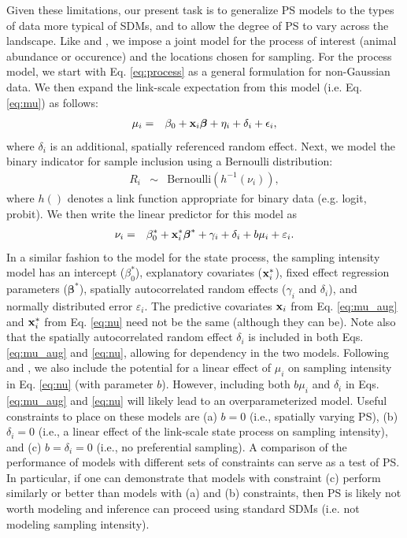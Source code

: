 \documentclass[times,mee,doublespace,]{besauth2}
\begin{document}
Given these limitations, our present task is to generalize PS models to the types of data more typical of SDMs, and to allow the degree of PS to vary across the landscape.  Like \citet{DiggleEtAl2010} and \citet{PatiEtAl2011}, we impose a joint model for the process of interest (animal abundance or occurence) and the locations chosen for sampling. For the process model, we start with Eq. \ref{eq:process} as a general formulation for non-Gaussian data.  We then expand the link-scale expectation from this model
(i.e. Eq. \ref{eq:mu}) as follows:
\begin{eqnarray}
  \mu_i & = & \beta_0 + {\bf x}_i \boldsymbol{\beta}+\eta_i+\delta_i+\epsilon_i,
\label{eq:mu_aug}
\end{eqnarray}
where $\delta_i$ is an additional, spatially referenced random effect.  Next, we model the binary indicator for sample inclusion using a Bernoulli distribution:
\begin{eqnarray}
  R_i & \sim & \text{Bernoulli}(h^{-1}(\nu_i)),
\end{eqnarray}
where $h()$ denotes a link function appropriate for binary data (e.g. logit, probit).  We then write the linear predictor for this model as
\begin{eqnarray}
  \nu_i & = & \beta_0^* + {\bf x}_i^* \boldsymbol{\beta}^*+\gamma_i+\delta_i+b \mu_i + \varepsilon_i.
\label{eq:nu}
\end{eqnarray}
 In a similar fashion to the model for the state process, the sampling intensity model has an intercept ($\beta_0^*$), explanatory covariates (${\bf x}_i^*$), fixed effect regression parameters ($\boldsymbol{\beta}^*$), spatially autocorrelated random effects ($\gamma_i$ and $\delta_i$), and normally distributed error $\varepsilon_i$.  The predictive covariates ${\bf x}_i$ from Eq. \ref{eq:mu_aug} and ${\bf x}_i^*$ from Eq. \ref{eq:nu} need not be the same (although they can be).  Note also that the  spatially autocorrelated random effect $\delta_i$ is included in both Eqs. \ref{eq:mu_aug} and \ref{eq:nu}, allowing for dependency in the two models.  Following \citet{DiggleEtAl2010} and \citet{PatiEtAl2011}, we also include the potential for a linear effect of $\mu_i$ on sampling intensity in Eq. \ref{eq:nu} (with parameter $b$).  However, including both $b \mu_i$ and $\delta_i$ in Eqs. \ref{eq:mu_aug} and \ref{eq:nu} will likely lead to an overparameterized model.  Useful constraints to place on these models are (a) $b=0$ (i.e., spatially varying PS), (b) $\delta_i = 0$ (i.e., a linear effect of the link-scale state process on sampling intensity), and (c) $b=\delta_i=0$ (i.e., no preferential sampling).  A comparison of the performance of models with different sets of constraints can serve as a test of PS.  In particular, if one can demonstrate that models with constraint (c) perform similarly or better than models with (a) and (b) constraints, then PS is likely not worth modeling and inference can proceed using standard SDMs (i.e. not modeling sampling intensity).
\end{document}

